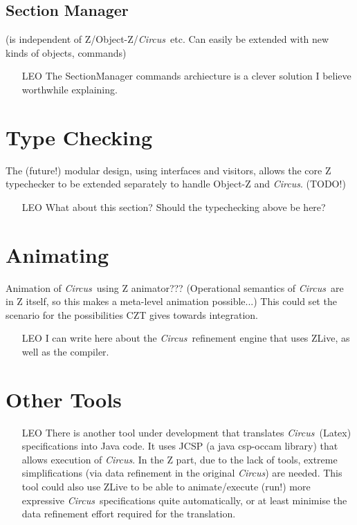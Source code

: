 \documentclass{llncs}
\newcommand{\Circus}{{\sf\slshape Circus}}
\begin{document}
\subsection{Section Manager}

  (is independent of Z/Object-Z/\Circus\ etc.
  Can easily be extended with new kinds of objects, commands)

    \begin{itemize}
        \item[LEO] The SectionManager commands archiecture is a clever solution I believe worthwhile explaining.
    \end{itemize}

\section{Type Checking}

      The (future!) modular design, using interfaces and visitors,
      allows the core Z typechecker to be extended separately
      to handle Object-Z and \Circus.  (TODO!)

    \begin{itemize}
        \item[LEO] What about this section? Should the typechecking above be here?
    \end{itemize}

\section{Animating}

    Animation of \Circus\ using Z animator???
      (Operational semantics of \Circus\ are in Z itself, so this makes a meta-level animation possible...)
    This could set the scenario for the possibilities CZT gives towards integration.

    \begin{itemize}
        \item[LEO] I can write here about the \Circus\ refinement engine that uses ZLive, as well as the compiler.
    \end{itemize}


\section{Other Tools}

    \begin{itemize}
        \item[LEO]
        There is another tool under development that translates \Circus\ (Latex) specifications into Java code.
        It uses JCSP (a java csp-occam library) that allows execution of \Circus.
        In the Z part, due to the lack of tools, extreme simplifications (via data refinement in the original \Circus)
        are needed.
        This tool could also use ZLive to be able to animate/execute (run!) more expressive \Circus\ specifications quite
        automatically, or at least minimise the data refinement effort required for the translation.
    \end{itemize}
\end{document}
